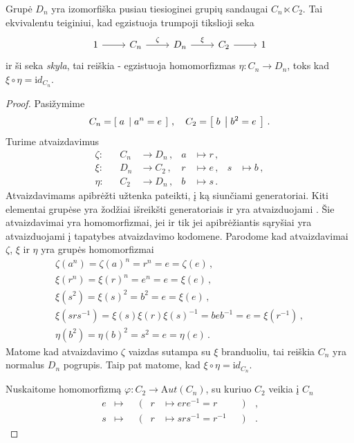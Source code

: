 \begin{proposition}
	Grupė $D_n$ yra izomorfiška pusiau tiesioginei grupių sandaugai $C_n \ltimes C_2$.
	Tai ekvivalentu teiginiui, kad egzistuoja trumpoji tikslioji seka
	\begin{equation}
		\begin{tikzcd}
			1 \arrow[r] &C_n \arrow[r,"\zeta"]	&D_n \arrow[r, "\xi"] &C_2 \arrow[r] &1
		\end{tikzcd}
	\end{equation}
	ir ši seka \emph{skyla},
	tai reiškia - egzistuoja homomorfizmas $\eta: C_n \to D_n$,
	toks kad $\xi \circ \eta = \mathup id_{C_n}$.
\end{proposition}
\begin{proof}
	Pasižymime
	\begin{equation}
		C_n = \left[\; a \;\left|\; a^n=e \;\right.\right]
		\,,\quad
		C_2 = \left[\; b \;\left|\; b^2=e \;\right.\right]
		\,.
	\end{equation}
	Turime atvaizdavimus
	\begin{equation}
		\begin{aligned}
			\zeta:	&& C_n &\to D_n \,,& a &\mapsto r \,,\\
			\xi:	&& D_n &\to C_2 \,,& r &\mapsto e \,, &s &\mapsto b\,,\\
			\eta:	&& C_2 &\to D_n \,,& b &\mapsto s \,.              
		\end{aligned}
	\end{equation}
	Atvaizdavimams apibrėžti užtenka pateikti,
	į ką siunčiami generatoriai.
	Kiti elementai grupėse yra žodžiai išreikšti generatoriais
	ir yra atvaizduojami .
	Šie atvaizdavimai yra homomorfizmai,
	jei ir tik jei apibrėžiantis sąryšiai yra atvaizduojami į tapatybes
	atvaizdavimo kodomene.
	Parodome kad atvaizdavimai $\zeta$, $\xi$ ir $\eta$ yra grupės homomorfizmai
	\begin{equation}
		\begin{gathered}
			\zeta(a^n) = \zeta(a)^n = r^n = e = \zeta(e)
			\,,\\
			\xi(r^n) = \xi(r)^n = e^n = e = \xi(e)
			\,,\\
			\xi(s^2) = \xi(s)^2 = b^2 = e = \xi(e)
			\,,\\
			\xi(srs^{-1}) = \xi(s)\xi(r)\xi(s)^{-1} = b e b^{-1} = e = \xi(r^{-1})
			\,,\\
			\eta(b^2) = \eta(b)^2 = s^2 = e = \eta(e)
			\,.
		\end{gathered}
	\end{equation}
	Matome kad atvaizdavimo $\zeta$ vaizdas sutampa su $\xi$ branduoliu,
	tai reiškia $C_n$ yra normalus $D_n$ pogrupis.
	Taip pat matome, kad $\xi \circ \eta = \mathup id_{C_n}$.
	
	Nuskaitome homomorfizmą $\varphi: C_2 \to \mathup Aut(C_n)$,
	su kuriuo $C_2$ veikia į $C_n$
	\begin{equation}
		\begin{aligned}
			e &\mapsto && (& r &\mapsto ere^{-1} = r      &&)&\,,\\
			s &\mapsto && (& r &\mapsto srs^{-1} = r^{-1} &&)&\,.
		\end{aligned}
	\end{equation}

\end{proof}

